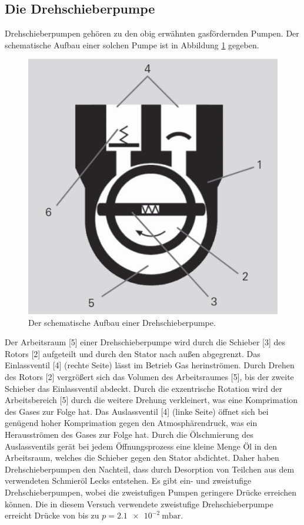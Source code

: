 \subsection{Die Drehschieberpumpe}
Drehschieberpumpen gehören zu den obig erwähnten gasfördernden Pumpen. Der schematische
Aufbau einer solchen Pumpe ist in Abbildung \ref{fig:drehschieber} gegeben.
\begin{figure}[H]
  \centering
  \caption{Der schematische Aufbau einer Drehschieberpumpe.}
  \label{fig:drehschieber}
  \includegraphics[scale=0.3]{pictures/drehschieber.png}
\end{figure}
\noindent
Der Arbeitsraum [5] einer Drehschieberpumpe wird durch die Schieber [3] des
Rotors [2] aufgeteilt und durch den Stator nach außen abgegrenzt.
Das Einlassventil [4] (rechte Seite) lässt im Betrieb Gas herinströmen.
Durch Drehen des Rotors [2] vergrößert sich das Volumen des Arbeitsraumes [5], bis der zweite Schieber
das Einlassventil abdeckt. Durch die exzentrische Rotation wird der Arbeitsbereich [5] durch die
weitere Drehung verkleinert, was eine Komprimation des Gases zur Folge hat. Das Auslassventil [4] (linke Seite)
öffnet sich bei genügend hoher Komprimation gegen den Atmosphärendruck, was ein Herausströmen des Gases zur
Folge hat. Durch die Ölschmierung des Auslassventils gerät bei jedem Öffnungsprozess eine
kleine Menge Öl in den Arbeitsraum, welches die Schieber gegen den Stator abdichtet. Daher haben
Drehschieberpumpen den Nachteil, dass durch Desorption von Teilchen aus dem verwendeten Schmieröl Lecks
entstehen. Es gibt ein- und
zweistufige Drehschieberpumpen, wobei die zweistufigen Pumpen geringere Drücke erreichen können.
Die in diesem Versuch verwendete zweistufige Drehschieberpumpe erreicht Drücke
von bis zu $p = \SI{2.1 e-2}{\milli\bar}$.

